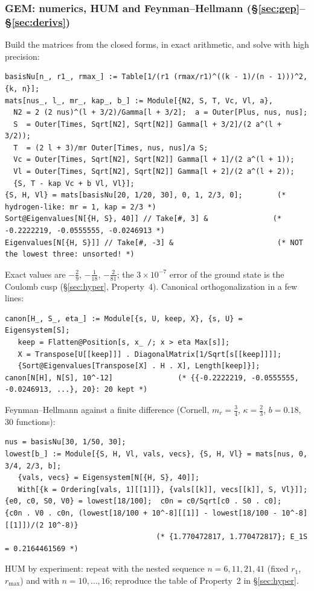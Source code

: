 \documentclass[11pt,a4paper]{article}
\numberwithin{equation}{section}
\theoremstyle{definition}
\theoremstyle{plain}
\theoremstyle{remark}
\numberwithin{algorithm}{section}
\newcommand{\mr}{m_r}
\begin{document}
\subsubsection{GEM: numerics, HUM and Feynman--Hellmann (\S\ref{sec:gep}--\S\ref{sec:derivs})}
Build the matrices from the closed forms, in exact arithmetic, and solve with high precision:
\begin{lstlisting}[style=wl]
basisNu[n_, r1_, rmax_] := Table[1/(r1 (rmax/r1)^((k - 1)/(n - 1)))^2, {k, n}];
mats[nus_, l_, mr_, kap_, b_] := Module[{N2, S, T, Vc, Vl, a},
  N2 = 2 (2 nus)^(l + 3/2)/Gamma[l + 3/2];  a = Outer[Plus, nus, nus];
  S  = Outer[Times, Sqrt[N2], Sqrt[N2]] Gamma[l + 3/2]/(2 a^(l + 3/2));
  T  = (2 l + 3)/mr Outer[Times, nus, nus]/a S;
  Vc = Outer[Times, Sqrt[N2], Sqrt[N2]] Gamma[l + 1]/(2 a^(l + 1));
  Vl = Outer[Times, Sqrt[N2], Sqrt[N2]] Gamma[l + 2]/(2 a^(l + 2));
  {S, T - kap Vc + b Vl, Vl}];
{S, H, Vl} = mats[basisNu[20, 1/20, 30], 0, 1, 2/3, 0];        (* hydrogen-like: mr = 1, kap = 2/3 *)
Sort@Eigenvalues[N[{H, S}, 40]] // Take[#, 3] &               (* -0.2222219, -0.0555555, -0.0246913 *)
Eigenvalues[N[{H, S}]] // Take[#, -3] &                        (* NOT the lowest three: unsorted! *)
\end{lstlisting}
Exact values are $-\frac29$, $-\frac1{18}$, $-\frac2{81}$; the $3\times10^{-7}$ error of the ground state is the Coulomb cusp (\S\ref{sec:hyper}, Property~4). Canonical orthogonalization in a few lines:
\begin{lstlisting}[style=wl]
canon[H_, S_, eta_] := Module[{s, U, keep, X}, {s, U} = Eigensystem[S];
   keep = Flatten@Position[s, x_ /; x > eta Max[s]];
   X = Transpose[U[[keep]]] . DiagonalMatrix[1/Sqrt[s[[keep]]]];
   {Sort@Eigenvalues[Transpose[X] . H . X], Length[keep]}];
canon[N[H], N[S], 10^-12]               (* {{-0.2222219, -0.0555555, -0.0246913, ...}, 20}: 20 kept *)
\end{lstlisting}
Feynman--Hellmann against a finite difference (Cornell, $\mr=\frac34$, $\kappa=\frac23$, $b=0.18$, 30 functions):
\begin{lstlisting}[style=wl]
nus = basisNu[30, 1/50, 30];
lowest[b_] := Module[{S, H, Vl, vals, vecs}, {S, H, Vl} = mats[nus, 0, 3/4, 2/3, b];
   {vals, vecs} = Eigensystem[N[{H, S}, 40]];
   With[{k = Ordering[vals, 1][[1]]}, {vals[[k]], vecs[[k]], S, Vl}]];
{e0, c0, S0, V0} = lowest[18/100];  c0n = c0/Sqrt[c0 . S0 . c0];
{c0n . V0 . c0n, (lowest[18/100 + 10^-8][[1]] - lowest[18/100 - 10^-8][[1]])/(2 10^-8)}
                                   (* {1.770472817, 1.770472817}; E_1S = 0.2164461569 *)
\end{lstlisting}
HUM by experiment: repeat  with the nested sequence $n=6,11,21,41$ (fixed $r_1$, $r_{\max}$) and with $n=10,\dots,16$; reproduce the table of Property~2 in \S\ref{sec:hyper}.
\end{document}
